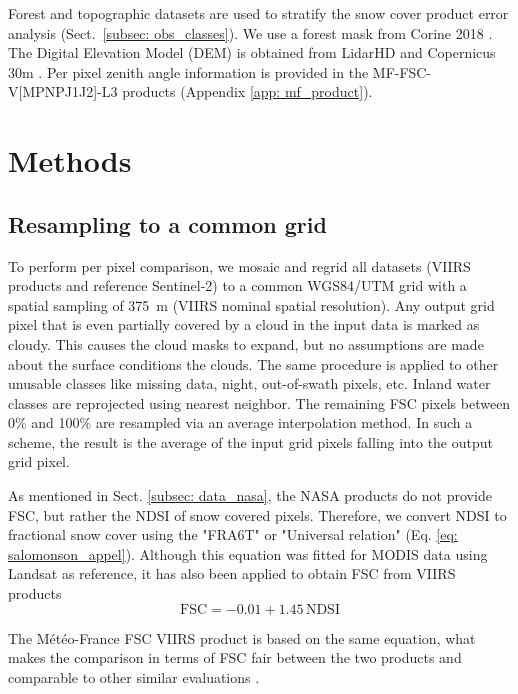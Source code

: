 \documentclass[tc, manuscript]{copernicus}
\begin{document}
Forest and topographic datasets are used to stratify the snow cover product error analysis (Sect.~\ref{subsec: obs_classes}). We use a forest mask from Corine 2018 \citep{corine2018}. The Digital Elevation Model (DEM) is obtained from LidarHD \citep{lidarhd} and Copernicus 30m \citep{copernicus_dem}. Per pixel zenith angle information is provided in the MF-FSC-V[MP\textbar NP\textbar J1\textbar J2]-L3 products (Appendix \ref{app: mf_product}). 

\section{Methods}
\label{sec: methods}

\subsection{Resampling to a common grid}
\label{subsec: meth_resampling} 

To perform per pixel comparison, we mosaic and regrid all datasets (VIIRS products and reference Sentinel-2) to a common WGS84/UTM grid with a spatial sampling of 375~m (VIIRS nominal spatial resolution). Any output grid pixel that is even partially covered by a cloud in the input data is marked as cloudy. This causes the cloud masks to expand, but no assumptions are made about the surface conditions the clouds. The same procedure is applied to other unusable classes like missing data, night, out-of-swath pixels, etc. Inland water classes are reprojected using nearest neighbor. The remaining FSC pixels between 0\% and 100\% are resampled via an average interpolation method. In such a scheme, the result is the average of the input grid pixels falling into the output grid pixel.

As mentioned in Sect. \ref{subsec: data_nasa}, the NASA products do not provide FSC, but rather the NDSI of snow covered pixels. Therefore, we convert NDSI to fractional snow cover using the "FRA6T" or "Universal relation" (Eq. \ref{eq: salomonson_appel}). Although this equation was fitted for MODIS data using Landsat as reference, it has also been applied to obtain FSC from VIIRS products \citep{stillinger_landsat_2023, jacques-hamilton_measurement_2025}
\begin{equation}
    \mathrm{FSC} = -0.01 + 1.45 \, \mathrm{NDSI}
    \label{eq: salomonson_appel}
\end{equation}

The Météo-France FSC VIIRS  product is based on the same equation, what makes the comparison in terms of FSC fair between the two products and comparable to other similar evaluations \citep{masson_assessment_2018}.
\end{document}
